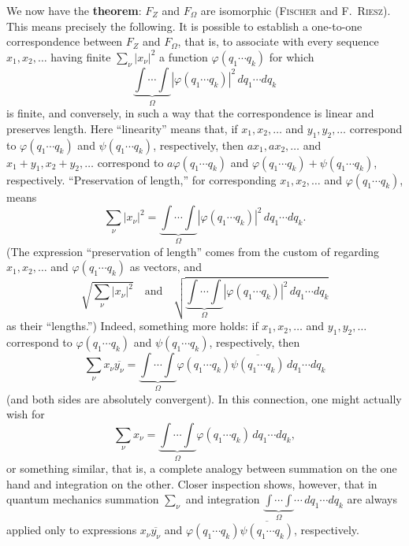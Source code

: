 \documentclass[fontsize=13pt,twoside,openany,headings=normal,parskip=false,bookmarkpackage=false,DIV=calc]{scrbook}
\begin{document}
We now have the \textbf{theorem}: $F_Z$ and $F_\Omega$ are isomorphic (\textsc{Fischer} and F.~\textsc{Riesz}). This means precisely the following. It is possible to establish a one-to-one correspondence between $F_Z$ and $F_\Omega$, that is, to associate with every sequence $x_1,x_2,\ldots$ having finite $\sum_\nu|x_\nu|^2$ a function $\varphi(q_1\cdots q_k)$ for which
\[\underbrace{\int\cdots\int}_{\Omega}|\varphi(q_1\cdots q_k)|^2\,dq_1\cdots dq_k\]
is finite, and conversely, in such a way that the correspondence is linear and preserves length. Here ``linearity'' means that, if $x_1,x_2,\ldots$ and $y_1,y_2,\ldots$ correspond to $\varphi(q_1\cdots q_k)$ and $\psi(q_1\cdots q_k)$, respectively, then $ax_1,ax_2,\ldots$ and $x_1+y_1,x_2+y_2,\ldots$ correspond to $a\varphi(q_1\cdots q_k)$ and $\varphi(q_1\cdots q_k)+\psi(q_1\cdots q_k)$, respectively. ``Preservation of length,'' for corresponding $x_1,x_2,\ldots$ and $\varphi(q_1\cdots q_k)$, means
\[
 \sum_\nu|x_\nu|^2
 =\underbrace{\int\cdots\int}_{\Omega}|\varphi(q_1\cdots q_k)|^2\,dq_1\cdots dq_k.
\]
(The expression ``preservation of length'' comes from the custom of regarding $x_1,x_2,\ldots$ and $\varphi(q_1\cdots q_k)$ as vectors, and
\[
 \sqrt{\sum_\nu|x_\nu|^2}
 \quad\text{and}\quad
 \sqrt{\underbrace{\int\cdots\int}_{\Omega}|\varphi(q_1\cdots q_k)|^2\,dq_1\cdots dq_k}
\]
as their ``lengths.'') Indeed, something more holds: if $x_1,x_2,\ldots$ and $y_1,y_2,\ldots$ correspond to $\varphi(q_1\cdots q_k)$ and $\psi(q_1\cdots q_k)$, respectively, then
\[
 \sum_\nu x_\nu\overline{y_\nu}
 =\underbrace{\int\cdots\int}_{\Omega}\varphi(q_1\cdots q_k)
 \overline{\psi(q_1\cdots q_k)}\,dq_1\cdots dq_k
\]
\hypertarget{origpage-17}{}%
(and both sides are absolutely convergent). In this connection, one might actually wish for
\[
 \sum_\nu x_\nu=\underbrace{\int\cdots\int}_{\Omega}\varphi(q_1\cdots q_k)\,dq_1\cdots dq_k,
\]
or something similar, that is, a complete analogy between summation on the one hand and integration on the other. Closer inspection shows, however, that in quantum mechanics summation $\sum_\nu$ and integration $\underbrace{\int\cdots\int}_{\Omega}\cdots\,dq_1\cdots dq_k$ are always applied only to expressions $x_\nu\overline{y_\nu}$ and $\varphi(q_1\cdots q_k)\overline{\psi(q_1\cdots q_k)}$, respectively.
\end{document}
